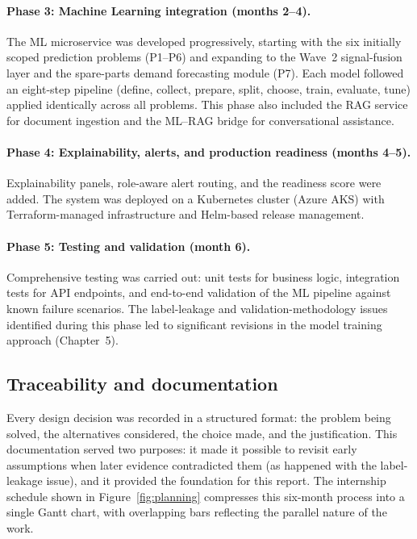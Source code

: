 \paragraph{Phase 3: Machine Learning integration (months 2--4).}
The ML microservice was developed progressively, starting with the six initially scoped prediction problems (P1--P6) and expanding to the Wave~2 signal-fusion layer and the spare-parts demand forecasting module (P7). Each model followed an eight-step pipeline (define, collect, prepare, split, choose, train, evaluate, tune) applied identically across all problems. This phase also included the RAG service for document ingestion and the ML--RAG bridge for conversational assistance.

\paragraph{Phase 4: Explainability, alerts, and production readiness (months 4--5).}
Explainability panels, role-aware alert routing, and the readiness score were added. The system was deployed on a Kubernetes cluster (Azure AKS) with Terraform-managed infrastructure and Helm-based release management.

\paragraph{Phase 5: Testing and validation (month 6).}
Comprehensive testing was carried out: unit tests for business logic, integration tests for API endpoints, and end-to-end validation of the ML pipeline against known failure scenarios. The label-leakage and validation-methodology issues identified during this phase led to significant revisions in the model training approach (Chapter~5).

\subsection{Traceability and documentation}

Every design decision was recorded in a structured format: the problem being solved, the alternatives considered, the choice made, and the justification. This documentation served two purposes: it made it possible to revisit early assumptions when later evidence contradicted them (as happened with the label-leakage issue), and it provided the foundation for this report. The internship schedule shown in Figure~\ref{fig:planning} compresses this six-month process into a single Gantt chart, with overlapping bars reflecting the parallel nature of the work.

